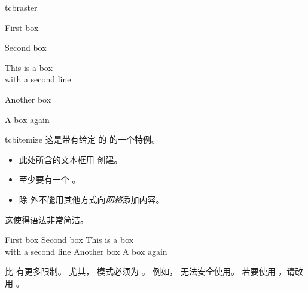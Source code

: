\begin{docEnvironment}[doc new and updated={2014-11-10}{2017-02-01}]{tcbraster}{}
\begin{dispExample}
\begin{tcbraster}[raster columns=2, raster equal height=rows,
  size=small,colframe=red!50!black,colback=red!10!white,colbacktitle=red!50!white,
  title={Box \# \thetcbrasternum}]
  \begin{tcolorbox}First box\end{tcolorbox}
  \begin{tcolorbox}Second box\end{tcolorbox}
  \begin{tcolorbox}This is a box\\with a second line\end{tcolorbox}
  \begin{tcolorbox}Another box\end{tcolorbox}
  \begin{tcolorbox}A box again\end{tcolorbox}
\end{tcbraster}
\end{dispExample}
\end{docEnvironment}


\clearpage

\begin{docEnvironment}[doc new=2014-11-10]{tcbitemize}{}
这是带有给定  的  的一个特例。
\begin{itemize}
\item 此处所含的文本框用  创建。
\item 至少要有一个 。
\item 除  外不能用其他方式向\emph{网格}添加内容。
\end{itemize}
这使得语法非常简洁。

\begin{dispExample}
\begin{tcbitemize}[raster columns=2, raster equal height=rows,
  size=small,colframe=red!50!black,colback=red!10!white,colbacktitle=red!50!white,
  title={Box \# \thetcbrasternum}]
  \tcbitem First box
  \tcbitem Second box
  \tcbitem This is a box\\with a second line
  \tcbitem[colback=yellow,colbacktitle=yellow!50!black] Another box
  \tcbitem A box again
\end{tcbitemize}
\end{dispExample}

\begin{marker}
 比  有更多限制。
尤其， 模式必须为 。
例如， 无法安全使用。
若要使用 ，请改用 。
\end{marker}
\end{docEnvironment}


